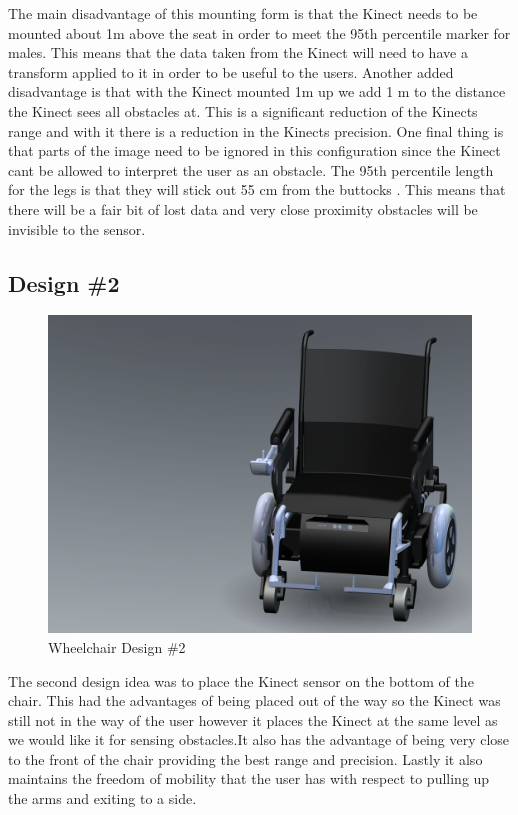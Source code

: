 \documentclass[oneside,final,a4paper]{report}
\begin{document}
The main disadvantage of this mounting form is that the Kinect needs to be mounted about 1m above the seat in order to meet the 95th percentile marker for males. This means that the data taken from the Kinect will need to have a transform applied to it in order to be useful to the users. Another added disadvantage is that with the Kinect mounted 1m up we add 1 m to the distance the Kinect sees all obstacles at. This is a significant reduction of the Kinects range and with it there is a reduction in the Kinects precision. One final thing is that parts of the image need to be ignored in this configuration since the Kinect cant be allowed to interpret the user as an obstacle. The 95th percentile length for the legs is that they will stick out 55 cm from the buttocks \cite{NASA}. This means that there will be a fair bit of lost data and very close proximity obstacles will be invisible to the sensor.

\subsection{Design \#2}
\begin{figure}[hbt]
 \centering
 \includegraphics[scale=0.15]{WheelChair_2}
 \caption{Wheelchair Design \#2}
\end{figure}

The second design idea was to place the Kinect sensor on the bottom of the chair.  This had the advantages of being placed out of the way so the Kinect was still not in the way of the user however it places the Kinect at the same level as we would like it for sensing obstacles.It also has the advantage of being very close to the front of the chair providing the best range and precision. Lastly it also maintains the freedom of mobility that the user has with respect to pulling up the arms and exiting to a side.
\end{document}
